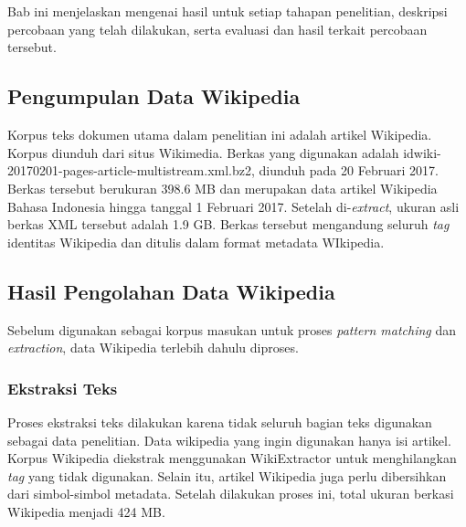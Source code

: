 \chapter{\babLima}
Bab ini menjelaskan mengenai hasil untuk setiap tahapan penelitian, deskripsi percobaan yang telah dilakukan, serta evaluasi dan hasil terkait percobaan tersebut.

\section{Pengumpulan Data Wikipedia}
Korpus teks dokumen utama dalam penelitian ini adalah artikel Wikipedia. Korpus diunduh dari situs Wikimedia. Berkas yang digunakan adalah idwiki-20170201-pages-article-multistream.xml.bz2, diunduh pada 20 Februari 2017. Berkas tersebut berukuran 398.6 MB dan merupakan data artikel Wikipedia Bahasa Indonesia hingga tanggal 1 Februari 2017. Setelah di-\textit{extract}, ukuran asli berkas XML tersebut adalah 1.9 GB. Berkas tersebut mengandung seluruh \textit{tag} identitas Wikipedia dan ditulis dalam format metadata WIkipedia. 


\section{Hasil Pengolahan Data Wikipedia}
Sebelum digunakan sebagai korpus masukan untuk proses \textit{pattern matching} dan \textit{extraction}, data Wikipedia terlebih dahulu diproses.

\subsection{Ekstraksi Teks}
Proses ekstraksi teks dilakukan karena tidak seluruh bagian teks digunakan sebagai data penelitian. Data wikipedia yang ingin digunakan hanya isi artikel. Korpus Wikipedia diekstrak menggunakan WikiExtractor untuk menghilangkan \textit{tag} yang tidak digunakan. Selain itu, artikel Wikipedia juga perlu dibersihkan dari simbol-simbol metadata. Setelah dilakukan proses ini, total ukuran berkasi Wikipedia menjadi 424 MB.

